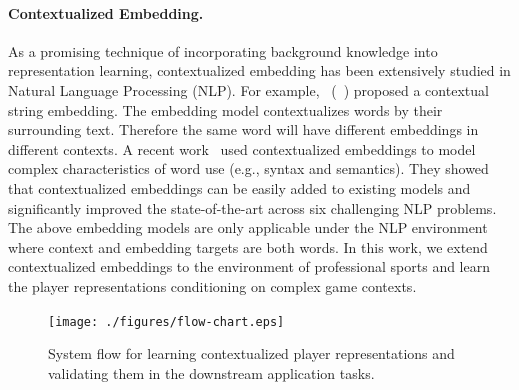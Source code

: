 \documentclass{article}
\begin{document}
\paragraph{Contextualized Embedding.}
As a promising technique of incorporating background knowledge into representation learning, contextualized embedding has been extensively studied in Natural Language Processing (NLP). For example, ~\citeauthor{AkbikBV18}(~\citeyear{AkbikBV18}) proposed a contextual string embedding. The embedding model contextualizes words by their surrounding text. Therefore the same word will have different embeddings in different contexts. 
A recent work~\cite{PetersNIGCLZ18} used contextualized embeddings to model complex characteristics of word use (e.g., syntax and semantics).
They showed that contextualized embeddings can be easily added to existing models and significantly improved the state-of-the-art across six challenging NLP problems. The above embedding models are only applicable under the NLP environment where context and embedding targets are both words. In this work, we extend contextualized embeddings to the environment of professional sports and learn the player representations conditioning on complex game contexts.

\begin{figure}[t]
    \centering
    \texttt{[image: ./figures/flow-chart.eps]}
    \caption{System flow for learning contextualized player representations and validating them in the downstream application tasks.
    } 
    \label{fig:flow-chart}
\end{figure}



\end{document}
